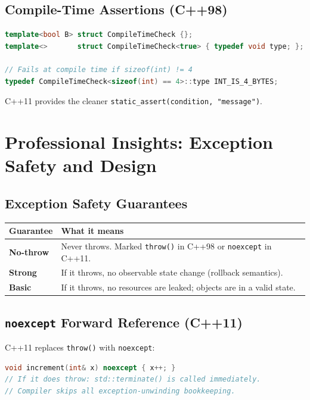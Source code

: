 \subsection{Compile-Time Assertions (C++98)}

\begin{lstlisting}[language=C++, caption={C++98 compile-time assertion trick}]
template<bool B> struct CompileTimeCheck {};
template<>       struct CompileTimeCheck<true> { typedef void type; };

// Fails at compile time if sizeof(int) != 4
typedef CompileTimeCheck<sizeof(int) == 4>::type INT_IS_4_BYTES;
\end{lstlisting}

C++11 provides the cleaner \texttt{static\_assert(condition, "message")}.

\section{Professional Insights: Exception Safety and Design}
\label{sec:exception-safety}

\subsection{Exception Safety Guarantees}

\begin{center}
\begin{tabular}{|l|l|}
\hline
\textbf{Guarantee} & \textbf{What it means} \\
\hline
\textbf{No-throw}  & Never throws. Marked \texttt{throw()} in C++98 or \texttt{noexcept} in C++11. \\
\textbf{Strong}    & If it throws, no observable state change (rollback semantics). \\
\textbf{Basic}     & If it throws, no resources are leaked; objects are in a valid state. \\
\hline
\end{tabular}
\end{center}

\subsection{\texttt{noexcept} Forward Reference (C++11)}

C++11 replaces \texttt{throw()} with \texttt{noexcept}:

\begin{lstlisting}[language=C++, caption={noexcept marks non-throwing functions}]
void increment(int& x) noexcept { x++; }
// If it does throw: std::terminate() is called immediately.
// Compiler skips all exception-unwinding bookkeeping.
\end{lstlisting}

